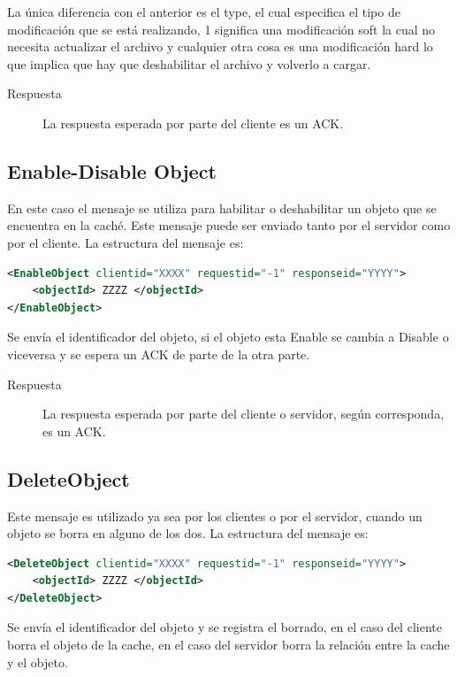 La única diferencia con el anterior es el type, el cual especifica el tipo de modificación que se está realizando, 1 significa una modificación soft la cual no necesita actualizar el archivo y cualquier otra cosa es una modificación hard lo que implica que hay que deshabilitar el archivo y volverlo a cargar.

\begin{description}
\item[Respuesta] La respuesta esperada por parte del cliente es un ACK.
\end{description}

\subsection{Enable-Disable Object}

En este caso el mensaje se utiliza para habilitar o deshabilitar un objeto que se encuentra en la caché. Este mensaje puede ser enviado tanto por el servidor como por el cliente. La estructura del mensaje es:

\begin{lstlisting}[language=XML,caption=Mensaje de EnableObject]
<EnableObject clientid="XXXX" requestid="-1" responseid="YYYY"> 
	<objectId> ZZZZ </objectId>
</EnableObject>
\end{lstlisting}

Se envía el identificador del objeto, si el objeto esta Enable se cambia a Disable o viceversa  y se espera un ACK de parte de la otra parte.

\begin{description}
\item[Respuesta] La respuesta esperada por parte del cliente o servidor, según corresponda, es un ACK.
\end{description}

\subsection{DeleteObject}
Este mensaje es utilizado ya sea por los clientes o por el servidor, cuando un objeto se borra en alguno de los dos. La estructura del mensaje es:

\begin{lstlisting}[language=XML,caption=Mensaje de DeleteObject]
<DeleteObject clientid="XXXX" requestid="-1" responseid="YYYY"> 
	<objectId> ZZZZ </objectId>
</DeleteObject>
\end{lstlisting}

Se envía el identificador del objeto y se registra el borrado, en el caso del cliente borra el objeto de la cache, en el caso del servidor borra la relación entre la cache y el objeto.

